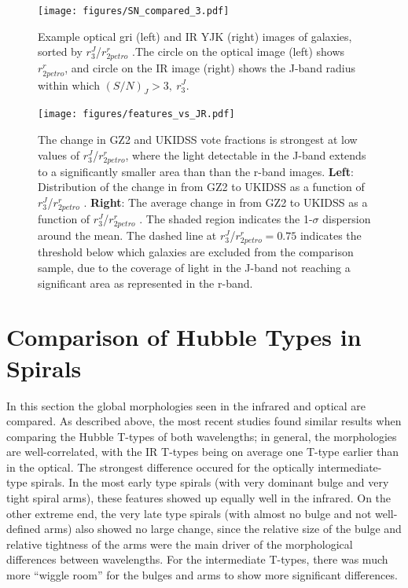 \begin{figure}
\centering
\texttt{[image: figures/SN\_compared\_3.pdf]}
\caption{Example optical gri (left) and IR YJK (right) images of galaxies, sorted by $r^{J}_{3}$/$r^{r}_{2petro}$ .The circle on the optical image (left) shows $r^{r}_{2petro}$, and circle on the IR image (right) shows the J-band radius within which $(S/N)_{J}>3,~r^{J}_3$.}
\label{fig:sn_compared}
\end{figure}

\begin{figure}
\centering
\texttt{[image: figures/features\_vs\_JR.pdf]}
\caption{The change in GZ2 and UKIDSS vote fractions is strongest at low values of $r^{J}_{3}$/$r^{r}_{2petro}$, where the light detectable in the J-band extends to a significantly smaller area than than the r-band images. \textbf{Left}: Distribution of the change in \ffeatures{} from GZ2 to UKIDSS as a function of $r^{J}_{3}$/$r^{r}_{2petro}$ . \textbf{Right}: The average change in \ffeatures from GZ2 to UKIDSS as a function of $r^{J}_{3}$/$r^{r}_{2petro}$ . The shaded region indicates the 1-$\sigma$ dispersion around the mean. The dashed line at $r^{J}_{3}$/$r^{r}_{2petro} =0.75$ indicates the threshold below which galaxies are excluded from the comparison sample, due to the coverage of light in the J-band not reaching a significant area as represented in the r-band.}
\label{fig:features_vs_JR}
\end{figure}

\section{Comparison of Hubble Types in Spirals}
In this section the global morphologies seen in the infrared and optical are compared. As described above, the most recent studies found similar results when comparing the Hubble T-types of both wavelengths; in general, the morphologies are well-correlated, with the IR T-types being on average one T-type earlier than in the optical. The strongest difference occured for the optically intermediate-type spirals. In the most early type spirals (with very dominant bulge and very tight spiral arms), these features showed up equally well in the infrared. On the other extreme end, the very late type spirals (with almost no bulge and not well-defined arms) also showed no large change, since the relative size of the bulge and relative tightness of the arms were the main driver of the morphological differences between wavelengths. For the intermediate T-types, there was much more ``wiggle room'' for the bulges and arms to show more significant differences.

